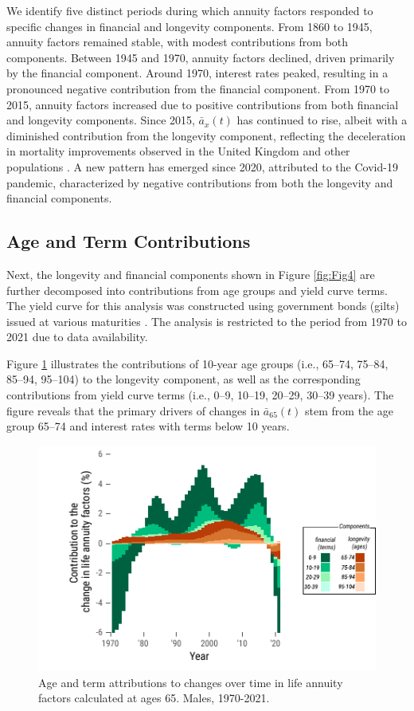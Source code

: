 \documentclass[12pt]{article}
\begin{document}
{We identify five distinct periods during which annuity factors responded to specific changes in financial and longevity components. From 1860 to 1945, annuity factors remained stable, with modest contributions from both components. Between 1945 and 1970, annuity factors declined, driven primarily by the financial component. Around 1970, interest rates peaked, resulting in a pronounced negative contribution from the financial component. From 1970 to 2015, annuity factors increased due to positive contributions from both financial and longevity components. Since 2015, \( \bar{a}_x(t) \) has continued to rise, albeit with a diminished contribution from the longevity component, reflecting the deceleration in mortality improvements observed in the United Kingdom and other populations \citep{djeundje2022slowdown}. A new pattern has emerged since 2020, attributed to the Covid-19 pandemic, characterized by negative contributions from both the longevity and financial components.


\subsection{Age and Term Contributions}

Next, the longevity and financial components shown in Figure \ref{fig:Fig4} are further decomposed into contributions from age groups and yield curve terms. The yield curve for this analysis was constructed using government bonds (gilts) issued at various maturities \citep{BankOfEngland2024}. The analysis is restricted to the period from 1970 to 2021 due to data availability.

Figure \ref{fig:Fig5} illustrates the contributions of 10-year age groups (i.e., 65–74, 75–84, 85–94, 95–104) to the longevity component, as well as the corresponding contributions from yield curve terms (i.e., 0–9, 10–19, 20–29, 30–39 years). The figure reveals that the primary drivers of changes in \( \bar{a}_{65}(t) \) stem from the age group 65–74 and interest rates with terms below 10 years.

\begin{figure}[H]
	\centering
	\includegraphics[width=0.6\linewidth]{Fig/ageTermStructureDescomposition}
	\caption{{Age and term attributions to changes over time in life annuity factors calculated at ages 65. Males, 1970-2021.}}
	\label{fig:Fig5}
\end{figure}

}
\end{document}
